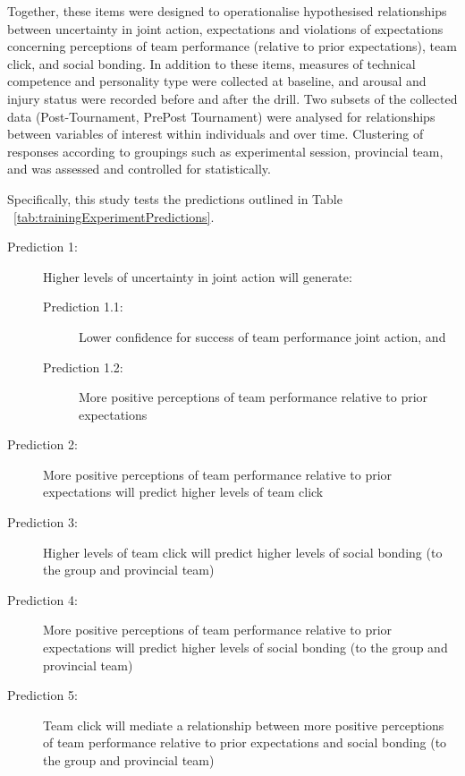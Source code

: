 Together, these items were designed to operationalise hypothesised relationships between uncertainty in joint action, expectations and violations of expectations concerning perceptions of team performance (relative to prior expectations), team click, and social bonding.  In addition to these items, measures of technical competence and personality type were collected at baseline, and arousal and injury status were recorded before and after the drill.  Two subsets of the collected data (Post-Tournament, PrePost Tournament) were analysed for relationships between variables of interest within individuals and over time.  Clustering of responses according to groupings such as experimental session, provincial team, and was assessed and controlled for statistically.



Specifically, this study tests the predictions outlined in Table ~\ref{tab:trainingExperimentPredictions}.




  \begin{description}
  \item[Prediction 1:] Higher levels of uncertainty in joint action will generate:
      \begin{description}
        \item [Prediction 1.1:] Lower confidence for success of team performance joint action, and
        \item [Prediction 1.2:] More positive perceptions of team performance relative to prior expectations
      \end{description}
  \item[Prediction 2:] More positive perceptions of team performance relative to prior expectations will predict higher levels of team click
  \item[Prediction 3:] Higher levels of team click will predict higher levels of social bonding (to the group and provincial team)
  \item[Prediction 4:] More positive perceptions of team performance relative to prior expectations will predict higher levels of social bonding (to the group and provincial team)
  \item[Prediction 5:] Team click will mediate a relationship between more positive perceptions of team performance relative to prior expectations and social bonding (to the group and provincial team)
  \end{description}







